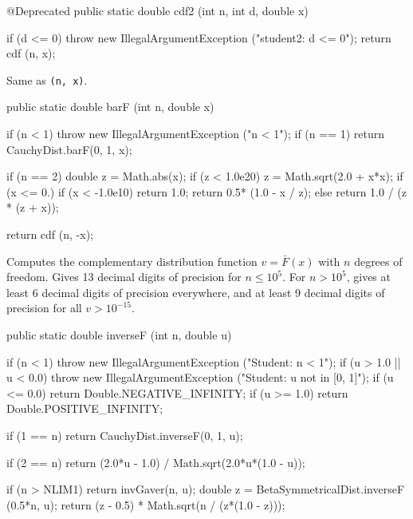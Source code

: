 \begin{code}

   @Deprecated
   public static double cdf2 (int n, int d, double x)\begin{hide} {
      if (d <= 0)
         throw new IllegalArgumentException ("student2:   d <= 0");
      return cdf (n, x);
   }\end{hide}
\end{code}
  \begin{tabb}
Same as \texttt{(n, x)}.
  \end{tabb}
\begin{code}

   public static double barF (int n, double x)\begin{hide} {
      if (n < 1)
        throw new IllegalArgumentException ("n < 1");
      if (n == 1)
         return CauchyDist.barF(0, 1, x);

      if (n == 2) {
         double z = Math.abs(x);
         if (z < 1.0e20)
            z = Math.sqrt(2.0 + x*x);
         if (x <= 0.) {
            if (x < -1.0e10)
               return 1.0;
            return 0.5* (1.0 - x / z);
         } else
            return 1.0 / (z * (z + x));
      }

      return cdf (n, -x);
   }\end{hide}
\end{code}
\begin{tabb} Computes the complementary distribution function $v = \bar{F}(x)$
with $n$ degrees of freedom. Gives 13 decimal digits of precision for $n \le 10^5$.
 For $n >  10^5$, gives  at least 6 decimal digits of precision everywhere, and
 at least 9 decimal digits of precision for all $v >  10^{-15}$.
\end{tabb}
\begin{code}

   public static double inverseF (int n, double u)\begin{hide} {
        if (n < 1)
            throw new IllegalArgumentException ("Student:   n < 1");
        if (u > 1.0 || u < 0.0)
            throw new IllegalArgumentException ("Student:   u not in [0, 1]");
        if (u <= 0.0)
           return Double.NEGATIVE_INFINITY;
        if (u >= 1.0)
           return Double.POSITIVE_INFINITY;

        if (1 == n)
           return CauchyDist.inverseF(0, 1, u);

        if (2 == n)
           return (2.0*u - 1.0) / Math.sqrt(2.0*u*(1.0 - u));

        if (n > NLIM1)
           return invGaver(n, u);
        double z = BetaSymmetricalDist.inverseF (0.5*n, u);
        return (z - 0.5) * Math.sqrt(n / (z*(1.0 - z)));
   }\end{hide}
\end{code}
